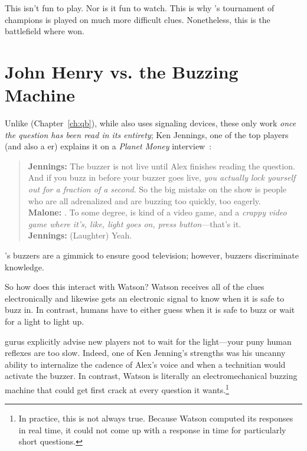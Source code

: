 This isn't fun to play.
%
Nor is it fun to watch.
%
This is why \jeopardyp{}'s tournament of champions is played on much more difficult clues.
%
Nonetheless, this is the battlefield where \jeopardy{} won.

\section{John Henry vs. the Buzzing Machine}

Unlike \qb{} (Chapter~\ref{ch:qb}), while \jeopardy{} also uses
signaling devices, these only work \emph{once the question has been
read in its entirety}; Ken Jennings, one of the top \jeopardy{}
players (and also a \qb{}er) explains it on a \textit{Planet Money}
interview~\cite{malone-19}:
\begin{quote}
{\bf Jennings:} The buzzer is
    not live until Alex finishes reading the question. And if you buzz
    in before your buzzer goes live, \emph{you actually lock yourself out
    for a fraction of a second}. So the big mistake on the show is
    people who are all adrenalized and are buzzing too quickly, too
    eagerly. \\
{\bf Malone:} . To some degree, \jeopardy{} is kind of a video game, and a \emph{crappy video game where it's, like, light goes on, press button}---that's it. \\
{\bf Jennings:} (Laughter) Yeah. \\
\end{quote}
\jeopardy{}'s buzzers are a gimmick to ensure good television; however, \qb{} buzzers discriminate knowledge.

So how does this interact with Watson?
%
Watson receives all of the clues electronically and likewise gets an electronic signal to know when it is safe to buzz in.
%
In contrast, humans have to either guess when it is safe to buzz or wait for a light to light up.

\jeopardy{} gurus explicitly advise new players not to wait for the light---your puny human reflexes are too slow.
%
Indeed, one of Ken Jenning's strengths was his uncanny ability to
internalize the cadence of Alex's voice and when a technitian would
activate the buzzer.
%
In contrast, Watson is literally an electromechanical buzzing machine
that could get first crack at every question it wants.\footnote{In
practice, this is not always true.  Because Watson computed its
responses in real time, it could not come up with a response in time
for particularly short questions.}

